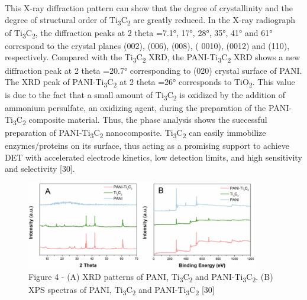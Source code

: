\begin{multicols}{2}
This X-ray diffraction pattern can show that the degree of
crystallinity and the degree of structural order of
Ti\textsubscript{3}C\textsubscript{2} are greatly reduced. In the
X-ray radiograph of Ti\textsubscript{3}C\textsubscript{2}, the
diffraction peaks at 2 theta =7.1°, 17°, 28°, 35°, 41° and
61° correspond to the crystal planes (002), (006), (008), (
0010), (0012) and (110), respectively. Compared with the
Ti\textsubscript{3}C\textsubscript{2} XRD, the
PANI-Ti\textsubscript{3}C\textsubscript{2} XRD shows a new
diffraction peak at 2 theta =20.7° corresponding to (020)
crystal surface of PANI. The XRD peak of
PANI-Ti\textsubscript{3}C\textsubscript{2} at 2 theta =26°
corresponds to TiO\textsubscript{2}. This value is due to the
fact that a small amount of Ti\textsubscript{3}C\textsubscript{2}
is oxidized by the addition of ammonium persulfate, an oxidizing
agent, during the preparation of the
PANI-Ti\textsubscript{3}C\textsubscript{2} composite material.
Thus, the phase analysis shows the successful preparation of
PANI-Ti\textsubscript{3}C\textsubscript{2} nanocomposite.
Ti\textsubscript{3}C\textsubscript{2} can easily immobilize
enzymes/proteins on its surface, thus acting as a promising
support to achieve DET with accelerated electrode kinetics, low
detection limits, and high sensitivity and selectivity {[}30{]}.
\end{multicols}

\begin{figure}[H]
	\centering
	\includegraphics[width=0.9\textwidth]{media/chem2/image15}
	\caption*{Figure 4 - (A) XRD patterns of PANI, Ti\textsubscript{3}C\textsubscript{2} and PANI-Ti\textsubscript{3}C\textsubscript{2}. (B) XPS spectras of PANI, Ti\textsubscript{3}C\textsubscript{2} and PANI-Ti\textsubscript{3}C\textsubscript{2} {[}30{]}}
\end{figure}

